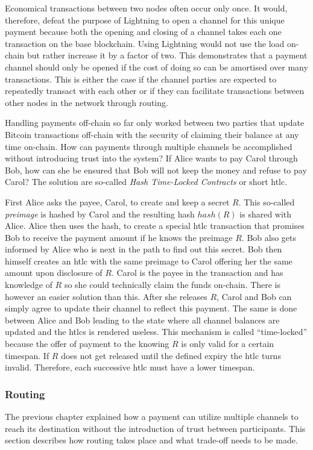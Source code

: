 \documentclass[final]{fhnwreport}       %
\begin{document}
Economical transactions between two nodes often occur only once. It would, therefore, defeat the purpose of Lightning to open a channel for this unique payment because both the opening and closing of a channel takes each one transaction on the base \gls{blockchain}. Using Lightning would not use the load on-chain but rather increase it by a factor of two. This demonstrates that a payment channel should only be opened if the cost of doing so can be amortised over many transactions. This is either the case if the channel parties are expected to repeatedly transact with each other or if they can facilitate transactions between other nodes in the network through routing. 

Handling payments off-chain so far only worked between two parties that update Bitcoin transactions off-chain with the security of claiming their balance at any time on-chain. How can payments through multiple channels be accomplished without introducing trust into the system? If Alice wants to pay Carol through Bob, how can she be ensured that Bob will not keep the money and refuse to pay Carol? The solution are so-called \emph{Hash Time-Locked Contracts} or short \gls{htlc}.

First Alice asks the payee, Carol, to create and keep a secret $R$. This so-called \emph{\gls{preimage}} is hashed by Carol and the resulting \gls{hash} $hash(R)$ is shared with Alice. Alice then uses the \gls{hash}, to create a special \gls{htlc} transaction that promises Bob to receive the payment amount if he knows the preimage $R$. Bob also gets informed by Alice who is next in the path to find out this secret. Bob then himself creates an \gls{htlc} with the same preimage to Carol offering her the same amount upon disclosure of $R$. Carol is the payee in the transaction and has knowledge of $R$ so she could technically claim the funds on-chain. There is however an easier solution than this. After she releases $R$, Carol and Bob can simply agree to update their channel to reflect this payment. The same is done between Alice and Bob leading to the state where all channel balances are updated and the \gls{htlc}s is rendered useless. This mechanism is called ``time-locked'' because the offer of payment to the knowing $R$ is only valid for a certain timespan. If $R$ does not get released until the defined expiry the \gls{htlc} turns invalid. Therefore, each successive \gls{htlc} must have a lower timespan.

\subsubsection{Routing}\label{subsec:routing}
The previous chapter explained how a payment can utilize multiple channels to reach its destination without the introduction of trust between participants. This section describes how routing takes place and what trade-off needs to be made.
\end{document}

